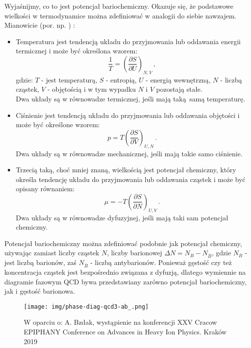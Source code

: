 \documentclass[a4paper,12pt]{article}
\begin{document}
Wyjaśnijmy, co to jest potencjał bariochemiczny. Okazuje się, że podstawowe wielkości w termodynamice można zdefiniować w analogii do siebie nawzajem. Mianowicie (por. np. \cite{schroeder}) :
\begin{itemize}
	\item Temperatura jest tendencją układu do przyjmowania lub oddawania energii termicznej i może być określona wzorem:
	\begin{equation}
	\frac{1}{T} = \left( \frac{\partial S}{\partial U} \right)_{N,V} \,,
	\end{equation}
	gdzie: $T$ - jest temperaturą, $S$ - entropią, $U$ - energią wewnętrzną, $N$ - liczbą cząstek, $V$ - objętością i w tym wypadku $N$ i $V$ pozostają stałe. \\
	Dwa układy są w równowadze termicznej, jeśli mają taką samą temperaturę.
	\item Ciśnienie jest tendencją układu do przyjmowania lub oddawania objętości i może być określone wzorem:
	\begin{equation}
	p = T \left( \frac{\partial S}{\partial V} \right)_{U,N}\,. 
	\end{equation}
	Dwa układy są w równowadze mechanicznej, jeśli mają takie samo ciśnienie.
	\item Trzecią taką, choć mniej znaną, wielkością jest potencjał chemiczny, który określa tendencję układu do przyjmowania lub oddawania cząstek i może być opisany równaniem:
	\begin{equation}
	\mu = -T \left( \frac{\partial S}{\partial N} \right)_{U,V}\,. 
	\end{equation}
	Dwa układy są w równowadze dyfuzyjnej, jeśli mają taki sam potencjał chemiczny.
\end{itemize}
Potencjał bariochemiczny można zdefiniować podobnie jak potencjał chemiczny, używając zamiast liczby cząstek $N$, liczby barionowej $\Delta N = N_B - N_{\overline{B}}$, gdzie $N_B$ - jest liczbą barionów, zaś $N_{\overline{B}}$ - liczbą antybarionów. Ponieważ gęstość czy też koncentracja cząstek jest bezpośrednio związana z dyfuzją, dlatego wymiennie na diagramie fazowym QCD bywa przedstawiany zarówno potencjał bariochemiczny, jak i gęstość barionowa.

\begin{figure}[H]
	\begin{center}
	\texttt{[image: img/phase-diag-qcd3-ab\_.png]}
	\vspace{-0.1in}
		\caption{  W oparciu o: A. Bzdak, wystąpienie na konferencji XXV Cracow EPIPHANY Conference on Advances in Heavy Ion Physics. Kraków 2019 } \label{fig:qcd-diag-ab}
	\end{center}
\end{figure}
\end{document}
